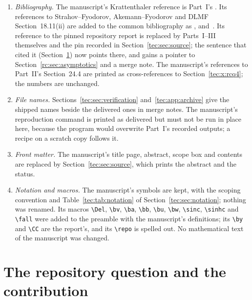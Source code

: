 \documentclass[11pt,a4paper]{article}
\numberwithin{equation}{section}
\theoremstyle{definition}
\theoremstyle{remark}
\newcommand{\CC}{\mathbb C}
\newcommand{\by}{\boldsymbol{y}}
\newcommand{\Del}{\Delta}
\newcommand{\bv}{\boldsymbol v}
\newcommand{\ba}{\boldsymbol a}
\newcommand{\bb}{\boldsymbol b}
\newcommand{\bu}{\boldsymbol u}
\newcommand{\bw}{\boldsymbol w}
\newcommand{\sinc}{\operatorname{sinc}}
\newcommand{\sinhc}{\operatorname{sinhc}}
\newcommand{\fall}[2]{(#1)_{\underline{#2}}}
\begin{document}
\begin{enumerate}[leftmargin=*,itemsep=2pt]
 positivity and the sharp scale) has no counterpart in Parts~I--III, which
 are fixed-parameter throughout.  No statement of Parts~I--III was
 changed.
\item \emph{Bibliography.}  The manuscript's Krattenthaler reference is
 Part~I's \cite{Krattenthaler2023}.  Its references to Strahov--Fyodorov,
 Akemann--Fyodorov and DLMF Section~18.11(ii) are added to the common
 bibliography as \cite{StrahovFyodorov2003}, \cite{AkemannFyodorov2003}
 and~\cite{DLMFMehlerHeine}.  Its reference to the pinned repository report
 is replaced by Parts~I--III themselves and the pin recorded in
 Section~\ref{tec:sec:source}; the sentence that cited it
 (Section~\ref{tec:sec:scope}) now points there, and gains a pointer to
 Section~\ref{rc:sec:asymptotics} and a merge note.  The manuscript's
 references to Part~II's Section~24.4 are printed as cross-references to
 Section~\ref{tec:x:rcq4}; the numbers are unchanged.
\item \emph{File names.}  Sections~\ref{tec:sec:verification}
 and~\ref{tec:app:archive} give the shipped names beside the delivered ones
 in merge notes.  The manuscript's reproduction command is printed as
 delivered but must not be run in place here, because the program would
 overwrite Part~I's recorded outputs; a recipe on a scratch copy follows it.
\item \emph{Front matter.}  The manuscript's title page, abstract, scope
 box and contents are replaced by Section~\ref{tec:sec:source}, which
 prints the abstract and the status.
\item \emph{Notation and macros.}  The manuscript's symbols are kept, with
 the scoping convention and Table~\ref{tec:tab:notation} of
 Section~\ref{tec:sec:notation}; nothing was renamed.  Its macros
 \verb|\Del|, \verb|\bv|, \verb|\ba|, \verb|\bb|, \verb|\bu|, \verb|\bw|,
 \verb|\sinc|, \verb|\sinhc| and \verb|\fall| were added to the preamble
 with the manuscript's definitions; its \verb|\by| and \verb|\CC| are the
 report's, and its \verb|\repo| is spelled out.  No mathematical text of the
 manuscript was changed.
\end{enumerate}

\section{The repository question and the contribution}\label{tec:sec:scope}
\end{document}
